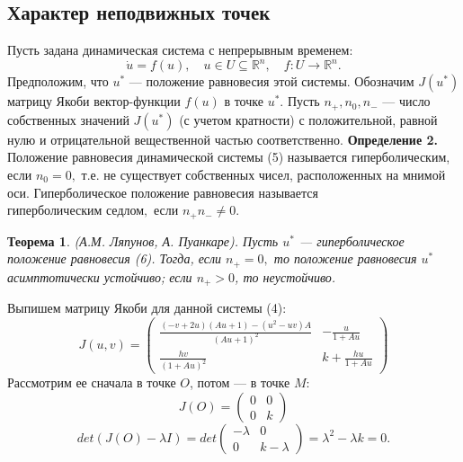 \documentclass[11pt]{article}
\begin{document}
	{\subsection{Характер неподвижных точек}
	{Пусть задана динамическая система с непрерывным временем:}
	\begin{equation}
	\dot{u} = f(u), \quad u \in U \subseteq \mathbb{R}^n, \quad f:U \rightarrow \mathbb{R}^n.
	\end{equation}
	{Предположим, что $u^*$ --- положение равновесия этой системы. Обозначим $J(u^*)$ матрицу Якоби вектор-функции $f(u)$ в точке $u^*$. Пусть $n_+, n_0, n_-$ --- число собственных значений $J(u^*)$ (с учетом кратности) с положительной, равной нулю и отрицательной вещественной частью соответственно.}
	\newline
	\newline
	{\textbf{Определение 2.} Положение равновесия динамической системы (5) называется $\textit{гиперболическим}$, если $n_0 = 0,$ т.е. не существует собственных чисел, расположенных на мнимой оси. Гиперболическое положение равновесия называется $\textit{гиперболическим седлом},$ если $n_+n_- \neq 0.$ } 
		\newtheorem{theorem}{Теорема}
	\begin{theorem}
	{(А.М. Ляпунов, А. Пуанкаре). Пусть $u^*$ --- гиперболическое положение равновесия (6). Тогда, если $n_+ = 0,$ то положение равновесия $u^*$ асимптотически устойчиво; если $n_+ > 0$, то неустойчиво.}
	\end{theorem}		
	{Выпишем матрицу Якоби для данной системы (4):}
	\begin{equation}
		J(u,v) = \begin{pmatrix}
		\frac{(-v + 2u)(Au + 1) - (u^2 - uv)A}{(Au + 1)^2}	& -\frac{u}{1 + Au} \\
			\frac{hv}{(1 + Au)^2}& k + \frac{hu}{1 + Au}
		\end{pmatrix}
	\end{equation}
	{Рассмотрим ее сначала в точке $O$, потом --- в точке $M$:}
	\begin{equation}
	J(O) = \begin{pmatrix}
	0 & 0 \\
	0 & k
	\end{pmatrix}
	\end{equation}
	\begin{equation}
	det(J(O) - \lambda I) = det\begin{pmatrix}
	-\lambda & 0 \\
	0 & k - \lambda
	\end{pmatrix} = \lambda^2 - \lambda k= 0.

\end{equation}}
\end{document}
